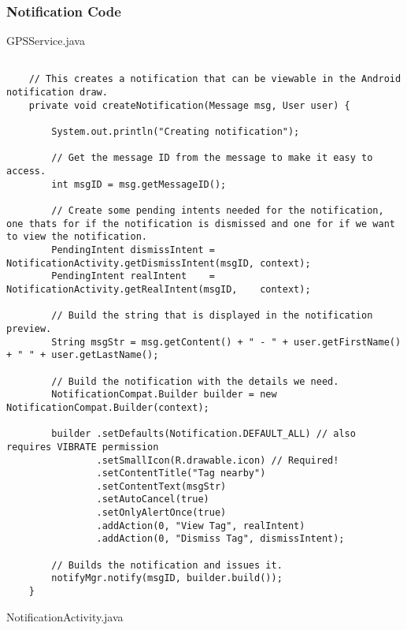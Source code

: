 \subsubsection*{Notification Code}

GPSService.java
\begin{lstlisting}
 
    // This creates a notification that can be viewable in the Android notification draw.
    private void createNotification(Message msg, User user) {

        System.out.println("Creating notification");

        // Get the message ID from the message to make it easy to access.
        int msgID = msg.getMessageID();

        // Create some pending intents needed for the notification, one thats for if the notification is dismissed and one for if we want to view the notification.
        PendingIntent dismissIntent = NotificationActivity.getDismissIntent(msgID, context);
        PendingIntent realIntent    = NotificationActivity.getRealIntent(msgID,    context);

        // Build the string that is displayed in the notification preview.
        String msgStr = msg.getContent() + " - " + user.getFirstName() + " " + user.getLastName();

        // Build the notification with the details we need.
        NotificationCompat.Builder builder = new NotificationCompat.Builder(context);

        builder .setDefaults(Notification.DEFAULT_ALL) // also requires VIBRATE permission
                .setSmallIcon(R.drawable.icon) // Required!
                .setContentTitle("Tag nearby")
                .setContentText(msgStr)
                .setAutoCancel(true)
                .setOnlyAlertOnce(true)
                .addAction(0, "View Tag", realIntent)
                .addAction(0, "Dismiss Tag", dismissIntent);

        // Builds the notification and issues it.
        notifyMgr.notify(msgID, builder.build());
    }
\end{lstlisting}

NotificationActivity.java

